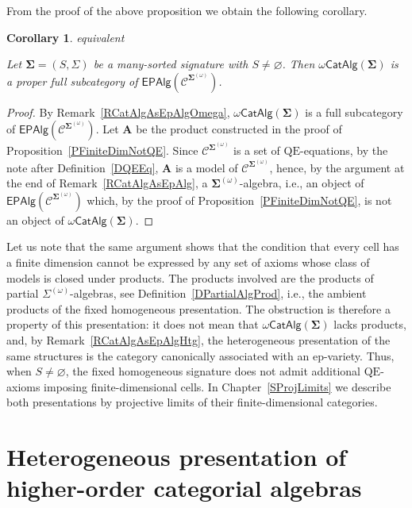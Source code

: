 \documentclass[a4paper, reqno]{amsbook}
\makeatletter
\newcommand{\sig}[1]{\mathbf{#1}}             %
\newcommand{\spec}[1]{\boldsymbol{\mathcal{#1}}} %
\newcommand{\QE}{\mathrm{QE}}
\theoremstyle{plain}
\newtheorem{corollary}[theorem]{Corollary}
\theoremstyle{definition}
\newcommand*{\CA@leanpending}{}
\newcommand*{\CA@leanrelation}{}
\newcommand*{\lean}[2]{%
  \ifcsname\string\color@lean@#1\endcsname\else
    \PackageError{main}{Unknown relation `#1' in \string\lean}{Use equivalent, weaker or stronger.}%
  \fi
  \gdef\CA@leanrelation{#1}%
  \gdef\CA@leanpending{#2}}
\makeatother
\begin{document}
From the proof of the above proposition we obtain the following corollary.

\begin{corollary}\label{CProperSubCatAlgOmega}\lean{equivalent}{Homogeneous.omegaModels_proper}
Let $\sig{\Sigma}=(S,\Sigma)$ be a many-sorted signature with $S\neq\varnothing$.
Then $\omega\mathsf{CatAlg}(\sig{\Sigma})$ is a proper full subcategory of $\mathsf{EPAlg}(\spec{C}^{\sig{\Sigma}^{(\omega)}})$.
\end{corollary}
\begin{proof}
By Remark~\ref{RCatAlgAsEpAlgOmega}, $\omega\mathsf{CatAlg}(\sig{\Sigma})$ is a full subcategory of $\mathsf{EPAlg}(\spec{C}^{\sig{\Sigma}^{(\omega)}})$.
Let $\mathbf{A}$ be the product constructed in the proof of Proposition~\ref{PFiniteDimNotQE}.
Since $\mathcal{C}^{\sig{\Sigma}^{(\omega)}}$ is a set of $\QE$-equations, by the note after Definition~\ref{DQEEq}, $\mathbf{A}$ is a model of $\spec{C}^{\sig{\Sigma}^{(\omega)}}$, hence, by the argument at the end of Remark~\ref{RCatAlgAsEpAlg}, a $\sig{\Sigma}^{(\omega)}$-algebra, i.e., an object of $\mathsf{EPAlg}(\spec{C}^{\sig{\Sigma}^{(\omega)}})$ which, by the proof of Proposition~\ref{PFiniteDimNotQE}, is not an object of $\omega\mathsf{CatAlg}(\sig{\Sigma})$.
\end{proof}

Let us note that the same argument shows that the condition that every cell has a finite dimension cannot be expressed by any set of axioms whose class of models is closed under products.
The products involved are the products of partial $\Sigma^{(\omega)}$-algebras, see Definition~\ref{DPartialAlgProd}, i.e., the ambient products of the fixed homogeneous presentation.
The obstruction is therefore a property of this presentation: it does not mean that $\omega\mathsf{CatAlg}(\sig{\Sigma})$ lacks products, and, by Remark~\ref{RCatAlgAsEpAlgHtg}, the heterogeneous presentation of the same structures is the category canonically associated with an ep-variety.
Thus, when $S\neq\varnothing$, the fixed homogeneous signature does not admit additional $\QE$-axioms imposing finite-dimensional cells.
In Chapter~\ref{SProjLimits} we describe both presentations by projective limits of their finite-dimensional categories.

\chapter[Heterogeneous presentation]{Heterogeneous presentation of higher-order categorial algebras}\label{SHeterogeneous}
\end{document}
